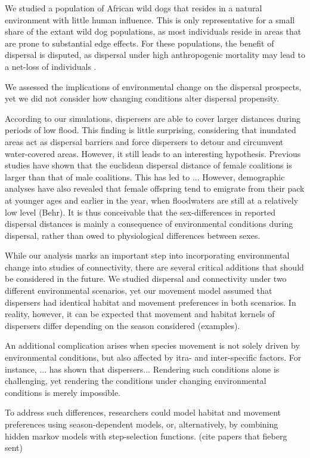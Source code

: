 \documentclass[abstract=on,10pt,a4paper,bibliography=totocnumbered]{article}
\begin{document}
We studied a population of African wild dogs that resides in a natural
environment with little human influence. This is only representative for a small
share of the extant wild dog populations, as most individuals reside in areas
that are prone to substantial edge effects. For these populations, the benefit
of dispersal is disputed, as dispersal under high anthropogenic mortality may
lead to a net-loss of individuals \citep{Leigh.2012}.

We assessed the implications of environmental change on the dispersal prospects,
yet we did not consider how changing conditions alter dispersal propensity.

According to our simulations, dispersers are able to cover larger distances
during periods of low flood. This finding is little surprising, considering that
inundated areas act as dispersal barriers and force dispersers to detour and
circumvent water-covered areas. However, it still leads to an interesting
hypothesis. Previous studies have shown that the euclidean dispersal distance of
female coalitions is larger than that of male coalitions. This has led to ...
However, demographic analyses have also revealed that female offspring tend to
emigrate from their pack at younger ages and earlier in the year, when
floodwaters are still at a relatively low level (Behr). It is thus conceivable
that the sex-differences in reported dispersal distances is mainly a consequence
of environmental conditions during dispersal, rather than owed to physiological
differences between sexes.

While our analysis marks an important step into incorporating environmental
change into studies of connectivity, there are several critical additions that
should be considered in the future. We studied dispersal and connectivity under
two different environmental scenarios, yet our movement model assumed that
dispersers had identical habitat and movement preferences in both scenarios. In
reality, however, it can be expected that movement and habitat kernels of
dispersers differ depending on the season considered (examples).

An additional complication arises when species movement is not solely driven by
environmental conditions, but also affected by itra- and inter-specific factors.
For instance, ... has shown that dispersers...
Rendering such conditions alone is challenging, yet rendering the conditions
under changing environmental conditions is merely impossible.

To address such differences, researchers could model
habitat and movement preferences using season-dependent models, or,
alternatively, by combining hidden markov models with step-selection functions.
(cite papers that fieberg sent)
\end{document}

